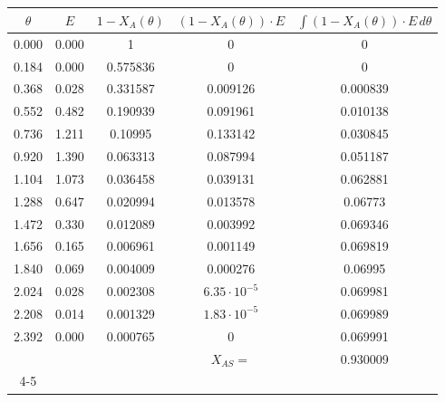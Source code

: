 \begin{enumerate}[label={\alph*)}]
	      \begin{center}
		      \begin{tabular}{|c|c|c|c|c|}
			      \hline
			      $\theta$              & $E$        & $1-X_A(\theta)$ & $(1-X_A(\theta)) \cdot E$ & $\int (1-X_A(\theta)) \cdot E \, d\theta$ \\ \hline
			      0.000                 & 0.000      & 1               & 0                         & 0                                         \\ \hline
			      0.184                 & 0.000      & 0.575836        & 0                         & 0                                         \\ \hline
			      0.368                 & 0.028      & 0.331587        & 0.009126                  & 0.000839                                  \\ \hline
			      0.552                 & 0.482      & 0.190939        & 0.091961                  & 0.010138                                  \\ \hline
			      0.736                 & 1.211      & 0.10995         & 0.133142                  & 0.030845                                  \\ \hline
			      0.920                 & 1.390      & 0.063313        & 0.087994                  & 0.051187                                  \\ \hline
			      1.104                 & 1.073      & 0.036458        & 0.039131                  & 0.062881                                  \\ \hline
			      1.288                 & 0.647      & 0.020994        & 0.013578                  & 0.06773                                   \\ \hline
			      1.472                 & 0.330      & 0.012089        & 0.003992                  & 0.069346                                  \\ \hline
			      1.656                 & 0.165      & 0.006961        & 0.001149                  & 0.069819                                  \\ \hline
			      1.840                 & 0.069      & 0.004009        & 0.000276                  & 0.06995                                   \\ \hline
			      2.024                 & 0.028      & 0.002308        & $6.35 \cdot 10^{-5}$      & 0.069981                                  \\ \hline
			      2.208                 & 0.014      & 0.001329        & $1.83 \cdot 10^{-5}$      & 0.069989                                  \\ \hline
			      2.392                 & 0.000      & 0.000765        & 0                         & 0.069991                                  \\ \hline
			      \multicolumn{3}{c|}{} & $X_{AS} =$ & 0.930009                                                                                \\ \cline{4-5}
		      \end{tabular}
	      \end{center}
\end{enumerate}
